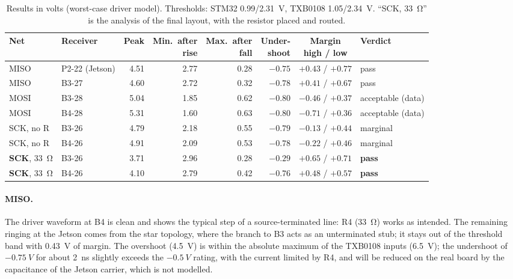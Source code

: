 \documentclass[11pt,a4paper]{article}
\begin{document}
\begin{table}[H]
\centering
\small\setlength{\tabcolsep}{4pt}
\begin{tabular}{llrrrrcl}
\toprule
Net & Receiver & Peak & \shortstack[r]{Min.\ after\\rise} & \shortstack[r]{Max.\ after\\fall} & \shortstack[r]{Under-\\shoot} & \shortstack{Margin\\high / low} & Verdict \\
\midrule
MISO & P2-22 (Jetson) & 4.51 & 2.77 & 0.28 & $-0.75$ & $+0.43$ / $+0.77$ & pass \\
MISO & B3-27 & 4.60 & 2.72 & 0.32 & $-0.78$ & $+0.41$ / $+0.67$ & pass \\
\midrule
MOSI & B3-28 & 5.04 & 1.85 & 0.62 & $-0.80$ & $-0.46$ / $+0.37$ & acceptable (data) \\
MOSI & B4-28 & 5.31 & 1.60 & 0.63 & $-0.80$ & $-0.71$ / $+0.36$ & acceptable (data) \\
\midrule
SCK, no R & B3-26 & 4.79 & 2.18 & 0.55 & $-0.79$ & $-0.13$ / $+0.44$ & marginal \\
SCK, no R & B4-26 & 4.91 & 2.09 & 0.53 & $-0.78$ & $-0.22$ / $+0.46$ & marginal \\
\textbf{SCK}, \qty{33}{\ohm} & B3-26 & 3.71 & 2.96 & 0.28 & $-0.29$ & $+0.65$ / $+0.71$ & \textbf{pass} \\
\textbf{SCK}, \qty{33}{\ohm} & B4-26 & 4.10 & 2.79 & 0.42 & $-0.76$ & $+0.48$ / $+0.57$ & \textbf{pass} \\
\bottomrule
\end{tabular}
\caption{Results in volts (worst-case driver model). Thresholds: STM32 0.99/\qty{2.31}{V}, TXB0108
1.05/\qty{2.34}{V}. ``SCK, \qty{33}{\ohm}'' is the analysis of the final layout, with the resistor placed and routed.}
\label{tab:results}
\end{table}

\paragraph{MISO.} The driver waveform at B4 is clean and shows the typical step of a source-terminated
line: R4 (\qty{33}{\ohm}) works as intended. The remaining ringing at the Jetson comes from the star
topology, where the branch to B3 acts as an unterminated stub; it stays out of the threshold
band with \qty{0.43}{V} of margin. The overshoot (\qty{4.5}{V}) is within the absolute maximum of the
TXB0108 inputs (\qty{6.5}{V}); the undershoot of $-\qty{0.75}{V}$ for about \qty{2}{ns} slightly exceeds the $-\qty{0.5}{V}$
rating, with the current limited by R4, and will be reduced on the real board by the capacitance
of the Jetson carrier, which is not modelled.
\end{document}
